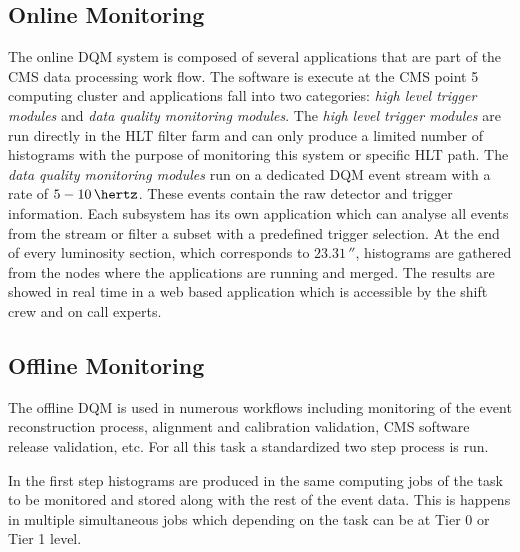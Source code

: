 \subsection{Online Monitoring}
\label{SECTION:TechnicalWork_DataQualityMonitoring_OnlineMonitoring}


The online \gls{DQM} system is composed of several applications that are part of the \gls{CMS} data processing work flow. The software is execute at the \gls{CMS} point 5 computing cluster and applications fall into two categories: \textit{high level trigger modules} and \textit{data quality monitoring modules}. The \textit{high level trigger modules} are run directly in the \gls{HLT} filter farm and can only produce a limited number of histograms with the purpose of monitoring this system or specific \gls{HLT} path. The \textit{data quality monitoring modules} run on a dedicated \gls{DQM} event stream with a rate of $5-10\,\hertz$. These events contain the raw detector and trigger information. Each subsystem has its own application which can analyse all events from the stream or filter a subset with a predefined trigger selection. At the end of every luminosity section, which corresponds to $23.31\,\second$, histograms are gathered from the nodes where the applications are running and merged. The results are showed in real time in a web based application which is accessible by the shift crew and on call experts.

\subsection{Offline Monitoring}
\label{SECTION:TechnicalWork_DataQualityMonitoring_OfflineMonitoring}


The offline \gls{DQM} is used in numerous workflows including monitoring of the event reconstruction process, alignment and calibration validation, \gls{CMS} software release validation, etc. For all this task a standardized two step process is run. 

In the first step histograms are produced in the same computing jobs of the task to be monitored and stored along with the rest of the event data. This is happens in multiple simultaneous jobs which depending on the task can be at Tier 0 or Tier 1 level.

